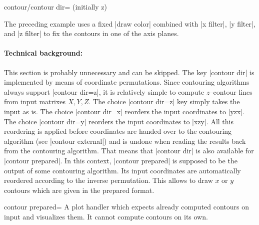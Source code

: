 {{\begin{pgfplotskey}{contour/contour dir= (initially z)}
\begin{codeexample}[]
\end{codeexample}
    \noindent The preceding example uses a fixed |draw color| combined with
    |x filter|, |y filter|, and |z filter| to fix the contours in one of the
    axis planes.


    \paragraph{Technical background:}

    This section is probably unnecessary and can be skipped. The key
    |contour dir| is implemented by means of coordinate permutations. Since
    contouring algorithms always support |contour dir=z|, it is relatively
    simple to compute $z$--contour lines from input matrixes $X, Y, Z$. The
    choice |contour dir=z| key simply takes the input as is. The choice
    |contour dir=x| reorders the input coordinates to |yzx|. The choice
    |contour dir=y| reorders the input coordinates to |xzy|. All this
    reordering is applied before coordinates are handed over to the contouring
    algorithm (see |contour external|) and is undone when reading the results
    back from the contouring algorithm. That means that |contour dir| is also
    available for |contour prepared|. In this context, |contour prepared| is
    supposed to be the output of some contouring algorithm. Its input
    coordinates are automatically reordered according to the inverse
    permutation. This allows to draw $x$ or $y$ contours which are given in the
    prepared format.
\end{pgfplotskey}

\begin{plottype}[/pgfplots]{contour prepared=\textcolor{black}{}}
    A plot handler which expects already computed contours on input and
    visualizes them. It cannot compute contours on its own.


\end{plottype}}}
